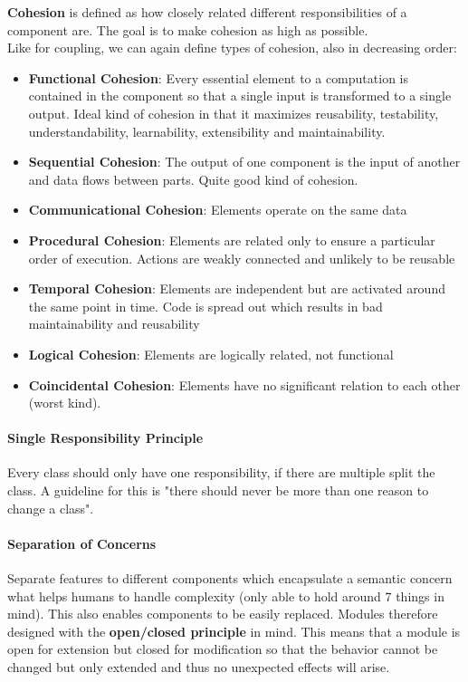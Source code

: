 \textbf{Cohesion} is defined as how closely related different responsibilities of a component are. The goal is to make cohesion as high as possible.\\
Like for coupling, we can again define types of cohesion, also in decreasing order:
\begin{itemize}
  \item \textbf{Functional Cohesion}: Every essential element to a computation is contained in the component so that a single input is transformed to a single output. Ideal kind of cohesion in that it maximizes reusability, testability, understandability, learnability, extensibility and maintainability.
  \item \textbf{Sequential Cohesion}: The output of one component is the input of another and data flows between parts. Quite good kind of cohesion.
  \item \textbf{Communicational Cohesion}: Elements operate on the same data
  \item \textbf{Procedural Cohesion}: Elements are related only to ensure a particular order of execution. Actions are weakly connected and unlikely to be reusable
  \item \textbf{Temporal Cohesion}: Elements are independent but are activated around the same point in time. Code is spread out which results in bad maintainability and reusability
  \item \textbf{Logical Cohesion}: Elements are logically related, not functional
  \item \textbf{Coincidental Cohesion}: Elements have no significant relation to each other (worst kind).
\end{itemize}

\paragraph{Single Responsibility Principle}
Every class should only have one responsibility, if there are multiple split the class.
A guideline for this is "there should never be more than one reason to change a class".

\paragraph{Separation of Concerns}
Separate features to different components which encapsulate a semantic concern what helps humans to handle complexity (only able to hold around 7 things in mind).
This also enables components to be easily replaced.
Modules therefore designed with the \textbf{open/closed principle} in mind.
This means that a module is open for extension but closed for modification so that the behavior cannot be changed but only extended and thus no unexpected effects will arise.

